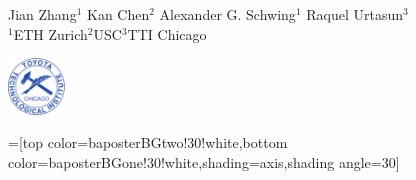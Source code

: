 \documentclass[a0paper,landscape,final]{baposter}
\begin{document}
\begin{poster}
  {\sf %
  Jian Zhang${}^1$\hspace{1cm}
  Kan Chen${}^2$\hspace{1cm}
  Alexander G. Schwing${}^1$\hspace{1cm}
  Raquel Urtasun${}^3$\\
  {\small ${}^1$ETH Zurich\hspace{1cm}${}^2$USC\hspace{1cm}${}^3$TTI Chicago}
  }
  {{\begin{minipage}{1.5cm}
    \hfill
    \includegraphics[width=1.5cm]{tticlogo.pdf}
  \end{minipage}}
  }

  =[top color=baposterBGtwo!30!white,bottom color=baposterBGone!30!white,shading=axis,shading angle=30]

     \newlength{\leftimgwidth}
     \setlength{\leftimgwidth}{0.78em+8.0em}

    \newcommand{\colouredcircle}[1]{%
      \tikz{\useasboundingbox (-0.2em,-0.32em) rectangle(0.2em,0.32em); \draw[draw=black,fill=baposterBGone!80!black!#1!white,line width=0.03em] (0,0) circle(0.18em);}}

\end{poster}
\end{document}

